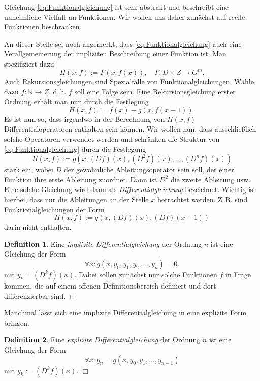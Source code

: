 \documentclass[a4paper,10pt,fleqn,twocolumn,twoside,openany]{scrartcl}
\numberwithin{equation}{section}
\newcommand{\N}{\mathbb N}
\theoremstyle{definition}
\newtheorem{Definition}{Definition}
\begin{document}
Gleichung \eqref{eq:Funktionalgleichung} ist sehr abstrakt und
beschreibt eine unheimliche Vielfalt an Funktionen.
Wir wollen uns daher zunächst auf reelle Funktionen beschränken.

An dieser Stelle sei noch angemerkt, dass
\eqref{eq:Funktionalgleichung} auch eine Verallgemeinerung der
impliziten Beschreibung einer Funktion ist. Man spezifiziert dazu
\begin{equation}
H(x,f) := F(x,f(x)),\quad F\colon D\times Z\to G^m.
\end{equation}
Auch Rekursionsgleichungen sind Spezialfälle von
Funktionalgleichungen. Wähle dazu $f\colon\N\to Z$, d.\,h. $f$ soll
eine Folge sein. Eine Rekursionsgleichung erster Ordnung erhält man
nun durch die Festlegung
\begin{equation}
H(x,f) := f(x)-g(x,f(x-1)).
\end{equation}
Es ist nun so, dass irgendwo in der Berechnung von $H(x,f)$
Differentialoperatoren enthalten sein können. Wir wollen nun,
dass ausschließlich solche Operatoren verwendet werden
und schränken die Struktur von \eqref{eq:Funktionalgleichung}
durch die Festlegung
\begin{equation}
H(x,f) := g(x,(Df)(x),(D^2 f)(x),\ldots,(D^n f)(x))
\end{equation}
stark ein, wobei $D$ der gewöhnliche Ableitungsoperator sein soll,
der einer Funktion ihre erste Ableitung zuordnet. Dann ist $D^2$ die
zweite Ableitung usw. Eine solche Gleichung wird dann als
\emph{Differentialgleichung} bezeichnet. Wichtig ist hierbei,
dass nur die Ableitungen an der Stelle $x$ betrachtet werden.
Z.\,B. sind Funktionalgleichungen der Form
\begin{equation}
H(x,f) := g(x,(Df)(x),(Df)(x-1))
\end{equation}
darin nicht enthalten.
\begin{Definition}
Eine \emph{implizite Differentialgleichung} der Ordnung $n$
ist eine Gleichung der Form
\begin{equation}
\forall x\colon g(x,y_0,y_1,y_2,\ldots,y_n)=0.
\end{equation}
mit $y_k=(D^k f)(x)$. Dabei sollen zunächst nur solche Funktionen $f$
in Frage kommen, die auf einem offenen Definitionsbereich
definiert und dort differenzierbar sind. $\Box$
\end{Definition}
\noindent
Manchmal lässt sich eine implizite Differentialgleichung
in eine explizite Form bringen.
\begin{Definition}
Eine \emph{explizite Differentialgleichung} der Ordnung $n$
ist eine Gleichung der Form
\begin{equation}
\forall x\colon y_n = g(x,y_0,y_1,\ldots,y_{n-1})
\end{equation}
mit $y_k:=(D^k f)(x)$. $\Box$
\end{Definition}
\end{document}
